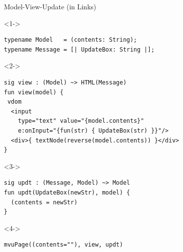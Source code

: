 \documentclass[11.5pt, aspectratio=169]{beamer}
\begin{document}
\begin{frame}[fragile]{Model-View-Update (in Links)}

\vspace{-1em}
\begin{overlayarea}{\linewidth}{10cm}
\begin{uncoverenv}<1->
\begin{lstlisting}[language=Links]
typename Model   = (contents: String);
typename Message = [| UpdateBox: String |];
\end{lstlisting}
\end{uncoverenv}

\begin{uncoverenv}<2->
\begin{lstlisting}[language=Links]
sig view : (Model) ~> HTML(Message)
fun view(model) {
 vdom
  <input
    type="text" value="{model.contents}"
    e:onInput="{fun(str) { UpdateBox(str) }}"/>
  <div>{ textNode(reverse(model.contents)) }</div>
}
\end{lstlisting}
\end{uncoverenv}

  \begin{uncoverenv}<3->
\begin{lstlisting}[language=Links]
sig updt : (Message, Model) ~> Model
fun updt(UpdateBox(newStr), model) {
  (contents = newStr)
}
\end{lstlisting}
\end{uncoverenv}

  \begin{uncoverenv}<4->
\begin{lstlisting}[language=Links]
mvuPage((contents=""), view, updt)
\end{lstlisting}
\end{uncoverenv}
\end{overlayarea}
\end{frame}

\end{document}
